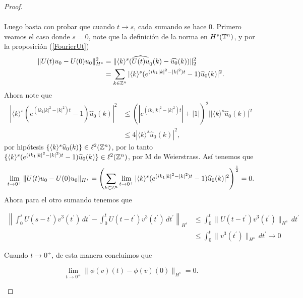 \begin{proof}
\begin{itemize}
\begin{align*}
       \end{align*}
       Luego basta con probar que cuando $t\to s$, cada sumando se hace 0. Primero veamos el caso donde $s=0$, note que la definición de la norma en $H^s(\mathbb{T}^n)$, y por la proposición (\ref{FourierUt}) 
       \begin{align*}
           \|U(t)u_0-U(0)u_0\|_{H^s}^2&=\|\langle k\rangle^s(\widehat{U(t)u}_0(k)-\widehat{u_0}(k))\|_2^2\\
           &=\sum_{k\in\mathbb{Z}^n}|\langle k\rangle^s(e^{(ik_1|k|^2-|k|^2)t}-1)\widehat{u}_0(k)|^2.
       \end{align*}
       Ahora note que
       \begin{align*}
           |\langle k\rangle^s(e^{(ik_1|k|^2-|k|^2)t}-1)\hat{u}_0(k)|^2&\leq(|e^{(ik_1|k|^2-|k|^2)t}|+|1|)^2||\langle k\rangle^s\hat{u}_0(k)|^2\\
           &\leq 4|\langle k\rangle^s\hat{u}_0(k)|^2,
       \end{align*}
        por hipótesis $\{\langle k\rangle^s\widehat{u}_0(k)\}\in\ell^2(\mathbb{Z}^n)$, por lo tanto  $\{\langle k\rangle^s(e^{(ik_1|k|^2-|k|^2)t}-1)\widehat{u}_0(k)\}\in\ell^2(\mathbb{Z}^n)$, por M de Weierstrass. Así tenemos que
       $$\lim_{t\to0^+}\|U(t)u_0-U(0)u_0\|_{H^s}=\left(\sum_{k\in\mathbb{Z}^n}\lim_{t\to0^+}|\langle k\rangle^s(e^{(ik_1|k|^2-|k|^2)t}-1)\widehat{u}_0(k)|^2\right)^{\frac{1}{2}}=0.$$
       Ahora para el otro sumando tenemos que
       
        \begin{align*}
             \left\|\int_0^sU(s-t^\prime)v^3(t^\prime)\,dt^\prime-\int_0^tU(t-t^\prime)v^3(t^\prime)\,dt^\prime\right\|_{H^s}&\leq\int_0^t\|U(t-t^\prime)v^3(t^\prime)\|_{H^s}\,dt^\prime\\
             &\leq\int_0^t\|v^3(t^\prime)\|_{H^s}\,dt^\prime\to 0
         \end{align*} 

       Cuando $t\to0^+$, de esta manera concluimos que

       $$\lim_{t\to0^+}\|\phi(v)(t)-\phi(v)(0)\|_{H^s}=0.$$


\end{itemize}
\end{proof}
